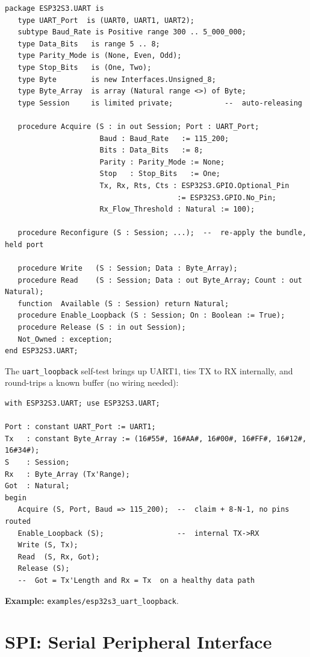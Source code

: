 \begin{lstlisting}
package ESP32S3.UART is
   type UART_Port  is (UART0, UART1, UART2);
   subtype Baud_Rate is Positive range 300 .. 5_000_000;
   type Data_Bits   is range 5 .. 8;
   type Parity_Mode is (None, Even, Odd);
   type Stop_Bits   is (One, Two);
   type Byte        is new Interfaces.Unsigned_8;
   type Byte_Array  is array (Natural range <>) of Byte;
   type Session     is limited private;            --  auto-releasing

   procedure Acquire (S : in out Session; Port : UART_Port;
                      Baud : Baud_Rate   := 115_200;
                      Bits : Data_Bits   := 8;
                      Parity : Parity_Mode := None;
                      Stop   : Stop_Bits   := One;
                      Tx, Rx, Rts, Cts : ESP32S3.GPIO.Optional_Pin
                                        := ESP32S3.GPIO.No_Pin;
                      Rx_Flow_Threshold : Natural := 100);

   procedure Reconfigure (S : Session; ...);  --  re-apply the bundle, held port

   procedure Write   (S : Session; Data : Byte_Array);
   procedure Read    (S : Session; Data : out Byte_Array; Count : out Natural);
   function  Available (S : Session) return Natural;
   procedure Enable_Loopback (S : Session; On : Boolean := True);
   procedure Release (S : in out Session);
   Not_Owned : exception;
end ESP32S3.UART;
\end{lstlisting}

The \texttt{uart\_loopback} self-test brings up UART1, ties TX to RX internally,
and round-trips a known buffer (no wiring needed):

\begin{lstlisting}
with ESP32S3.UART; use ESP32S3.UART;

Port : constant UART_Port := UART1;
Tx   : constant Byte_Array := (16#55#, 16#AA#, 16#00#, 16#FF#, 16#12#, 16#34#);
S    : Session;
Rx   : Byte_Array (Tx'Range);
Got  : Natural;
begin
   Acquire (S, Port, Baud => 115_200);  --  claim + 8-N-1, no pins routed
   Enable_Loopback (S);                 --  internal TX->RX
   Write (S, Tx);
   Read  (S, Rx, Got);
   Release (S);
   --  Got = Tx'Length and Rx = Tx  on a healthy data path
\end{lstlisting}

\noindent\textbf{Example:} \texttt{examples/esp32s3\_uart\_loopback}.

\section{SPI: Serial Peripheral Interface}
\label{app:int:spi}

